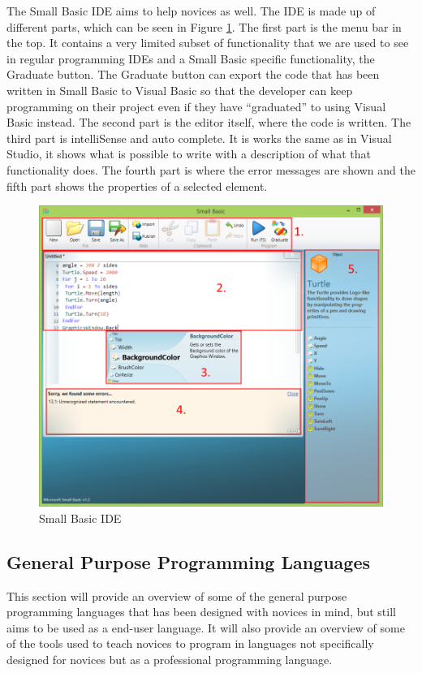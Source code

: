 The Small Basic IDE aims to help novices as well. The IDE is made up of different parts, which can be seen in Figure \ref{fig:small_basic_ide}. The first part is the menu bar in the top. It contains a very limited subset of functionality that we are used to see in regular programming IDEs and a Small Basic specific functionality, the Graduate button. The Graduate button can export the code that has been written in Small Basic to Visual Basic so that the developer can keep programming on their project even if they have ``graduated'' to using Visual Basic instead. The second part is the editor itself, where the code is written. The third part is intelliSense and auto complete. It is works the same as in Visual Studio, it shows what is possible to write with a description of what that functionality does. The fourth part is where the error messages are shown and the fifth part shows the properties of a selected element.

\begin{figure}[H]
\begin{center}
\includegraphics[scale=0.60]{./pics/SmallBasic.png}
\caption{Small Basic IDE}
\label{fig:small_basic_ide}
\end{center}
\end{figure}

\subsection{General Purpose Programming Languages}
This section will provide an overview of some of the general purpose programming languages that has been designed with novices in mind, but still aims to be used as a end-user language. It will also provide an overview of some of the tools used to teach novices to program in languages not specifically designed for novices but as a professional programming language. 

